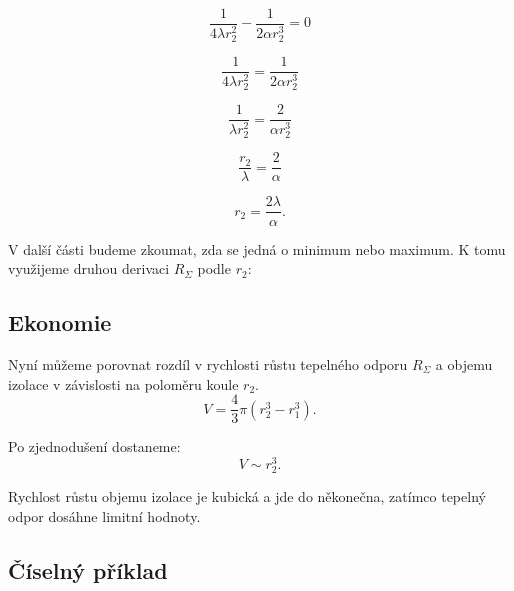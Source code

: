 \documentclass{article}
\begin{document}
$$
    \frac{1}{4 \lambda r_2^2} - \frac{1}{2 \alpha r_2^3} = 0
$$

$$
    \frac{1}{4 \lambda r_2^2} = \frac{1}{2 \alpha r_2^3}
$$

$$
    \frac{1}{\lambda r_2^2} = \frac{2}{\alpha r_2^3}
$$

$$
    \frac{r_2}{\lambda} = \frac{2}{\alpha}
$$

$$
    r_2 = \frac{2 \lambda}{\alpha}.
$$

V další části budeme zkoumat, zda se jedná o minimum nebo maximum. K tomu využijeme druhou derivaci $R_{\Sigma}$ podle $r_2$:

\begin{center}
\end{center}


\subsection{Ekonomie}

Nyní můžeme porovnat rozdíl v rychlosti růstu tepelného odporu $R_{\Sigma}$ a objemu izolace v závislosti na poloměru koule $r_2$.
$$
    V = \frac{4}{3} \pi (r_2^3 - r_1^3).
$$

Po zjednodušení dostaneme:
$$
    V \sim r_2^3.
$$

Rychlost růstu objemu izolace je kubická a jde do někonečna, zatímco tepelný odpor dosáhne limitní hodnoty.


\subsection{Číselný příklad}
\end{document}
